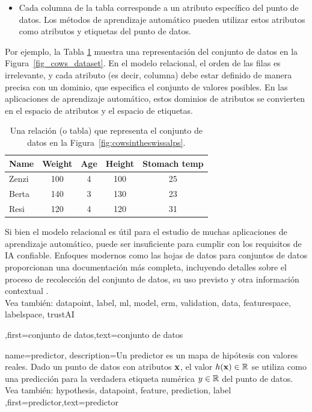 {{\begin{itemize}
		\item Cada columna de la tabla corresponde a un atributo específico del punto de datos. 
		Los métodos de aprendizaje automático pueden utilizar estos atributos como atributos y etiquetas del punto de datos.
		\end{itemize}
		Por ejemplo, la Tabla \ref{tab:cowdata} muestra una representación del conjunto de datos en la Figura\ \ref{fig_cows_dataset}. 
		En el modelo relacional, el orden de las filas es irrelevante, y cada atributo (es decir, columna) debe estar definido de manera precisa con un dominio, que especifica el conjunto de valores posibles.
		En las aplicaciones de aprendizaje automático, estos dominios de atributos se convierten en el espacio de atributos y el espacio de etiquetas. 
		\begin{table}[H]
			\centering
			\begin{tabular}{lcccc}
				\hline
				\textbf{Name} & \textbf{Weight} & \textbf{Age} & \textbf{Height} & \textbf{Stomach temp} \\
				\hline
				Zenzi & 100 & 4 & 100 & 25 \\
				Berta & 140 & 3 & 130 & 23 \\
				Resi  & 120 & 4 & 120 & 31 \\
				\hline
			\end{tabular}
			\caption{Una relación (o tabla) que representa el conjunto de datos en la Figura\ \ref{fig:cowsintheswissalps}.}
			\label{tab:cowdata}
		\end{table}
 Si bien el modelo relacional es útil para el estudio de muchas aplicaciones de aprendizaje automático, puede ser insuficiente 
 para cumplir con los requisitos de IA confiable. Enfoques modernos como las hojas de datos para conjuntos de datos proporcionan una documentación más completa,   
 incluyendo detalles sobre el proceso de recolección del conjunto de datos, su uso previsto y otra información contextual 
 \cite{DatasheetData2021}.
 \\
		Vea también: \gls{datapoint}, \gls{label}, \gls{ml}, \gls{model},  \gls{erm}, \gls{validation}, \gls{data}, \gls{featurespace}, \gls{labelspace}, \gls{trustAI}},first={conjunto de datos},text={conjunto de datos}  
}

{name={predictor},
	description={Un predictor es un mapa de hipótesis con valores reales.
		Dado un punto de datos con atributos ${\bf x}$, el valor 
		$h({\bf x}) \in \mathbb{R}$ se utiliza como una predicción para la verdadera  
		etiqueta numérica $y \in \mathbb{R}$ del punto de datos. 
		\\
		Vea también: \gls{hypothesis}, \gls{datapoint}, \gls{feature}, \gls{prediction}, \gls{label} },first={predictor},text={predictor}  
}


